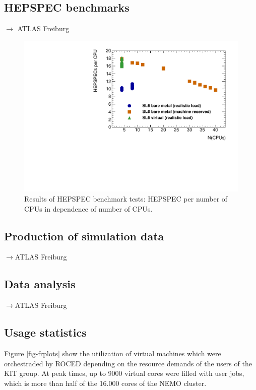 \subsection{HEPSPEC benchmarks}
$\to$ ATLAS Freiburg
\begin{figure}[htbp]
  \includegraphics[width=\columnwidth]{figures/HEPSPECpCPUvsCPU.pdf}
\caption{Results of HEPSPEC benchmark tests: HEPSPEC per number of
  CPUs in dependence of number of CPUs.}
\label{fig:HEPSPECpCPUvsCPU-atlas}
\end{figure}




\subsection{Production of simulation data}
$\to$ATLAS Freiburg
\subsection{Data analysis}
$\to$ATLAS Freiburg 

\subsection{Usage statistics}
Figure \ref{fig-frplots} show the utilization of virtual machines which were orchestraded by ROCED depending on the resource demands of the users of the KIT group. At peak times, up to 9000 virtual cores were filled with user jobs, which is more than half of the 16.000 cores of the NEMO cluster. 

